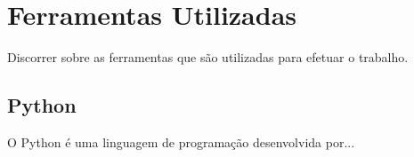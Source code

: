 \section{Ferramentas Utilizadas}
\label{sec:ferramentas}
Discorrer sobre as ferramentas que são utilizadas para efetuar o trabalho.

\subsection{Python}
\label{subsec:python}
O Python é uma linguagem de programação desenvolvida por...